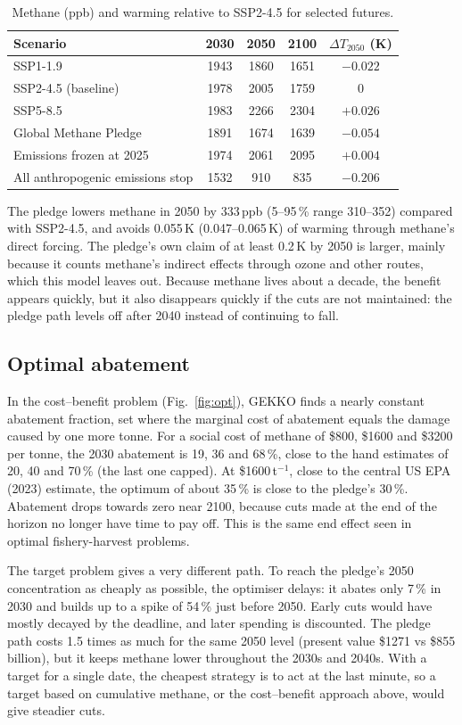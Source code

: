 \documentclass[11pt,a4paper]{article}
\begin{document}
\begin{table}[!htb]
\centering\small
\caption{Methane (ppb) and warming relative to SSP2-4.5 for selected futures.}
\label{tab:scen}
\begin{tabular}{lcccc}
\toprule
Scenario & 2030 & 2050 & 2100 & $\Delta T_{2050}$ (K)\\
\midrule
SSP1-1.9 & 1943 & 1860 & 1651 & $-0.022$\\
SSP2-4.5 (baseline) & 1978 & 2005 & 1759 & 0\\
SSP5-8.5 & 1983 & 2266 & 2304 & $+0.026$\\
Global Methane Pledge & 1891 & 1674 & 1639 & $-0.054$\\
Emissions frozen at 2025 & 1974 & 2061 & 2095 & $+0.004$\\
All anthropogenic emissions stop & 1532 & 910 & 835 & $-0.206$\\
\bottomrule
\end{tabular}
\end{table}

The pledge lowers methane in 2050 by 333\,ppb (5--95\,\% range 310--352) compared with SSP2-4.5, and avoids 0.055\,K (0.047--0.065\,K) of warming through methane's direct forcing. The pledge's own claim of at least 0.2\,K by 2050 is larger, mainly because it counts methane's indirect effects through ozone and other routes, which this model leaves out. Because methane lives about a decade, the benefit appears quickly, but it also disappears quickly if the cuts are not maintained: the pledge path levels off after 2040 instead of continuing to fall.

\subsection{Optimal abatement}
In the cost--benefit problem (Fig.~\ref{fig:opt}), GEKKO finds a nearly constant abatement fraction, set where the marginal cost of abatement equals the damage caused by one more tonne. For a social cost of methane of \$800, \$1600 and \$3200 per tonne, the 2030 abatement is 19, 36 and 68\,\%, close to the hand estimates of 20, 40 and 70\,\% (the last one capped). At \$1600\,t$^{-1}$, close to the central US EPA (2023) estimate, the optimum of about 35\,\% is close to the pledge's 30\,\%. Abatement drops towards zero near 2100, because cuts made at the end of the horizon no longer have time to pay off. This is the same end effect seen in optimal fishery-harvest problems.

The target problem gives a very different path. To reach the pledge's 2050 concentration as cheaply as possible, the optimiser delays: it abates only 7\,\% in 2030 and builds up to a spike of 54\,\% just before 2050. Early cuts would have mostly decayed by the deadline, and later spending is discounted. The pledge path costs 1.5 times as much for the same 2050 level (present value \$1271 vs \$855 billion), but it keeps methane lower throughout the 2030s and 2040s. With a target for a single date, the cheapest strategy is to act at the last minute, so a target based on cumulative methane, or the cost--benefit approach above, would give steadier cuts.
\end{document}
